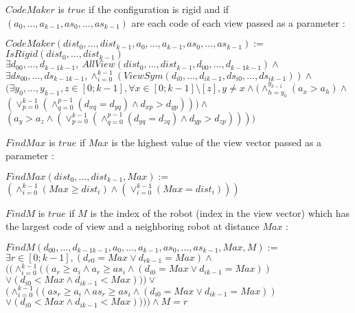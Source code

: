 \documentclass{article}
\begin{document}
$CodeMaker$ is $true$ if the configuration is rigid and if $(a_{0}, ..., a_{k-1}, as_{0}, ..., as_{k-1})$ are each code of each view passed as a parameter :

\begin{center}

$CodeMaker(dist_{0}, ...,dist_{k-1}, a_{0}, ..., a_{k-1}, as_{0}, ..., as_{k-1}):=$\\
$IsRigid(dist_{0}, ...,dist_{k-1})$\\
$\exists d_{00}, ...,d_{k-1k-1},\ AllView(dist_{0}, ...,dist_{k-1}, d_{00}, ...,d_{k-1k-1})\land$\\
$\exists ds_{00}, ...,ds_{k-1k-1}, \land_{i=0}^{k-1} (ViewSym(d_{i0}, ..., d_{ik-1}, ds_{i0}, ..., ds_{ik-1}))\land$\\
$(\exists y_{0}, ..., y_{k-1},z \in [0;k-1], \forall x \in [0;k-1] \setminus [z], y\not=x \land
(\land_{h=y_{0}}^{y_{k-1}}(a_{x} > a_{h}) \land $\\
$(\lor_{p=0}^{k-1}(\land_{q=0}^{p-1}(d_{xq} = d_{yq}) \land d_{xp} > d_{yp} ) ) )\land $\\
$(a_{y} > a_{z} \land (\lor_{p=0}^{k-1}(\land_{q=0}^{p-1}(d_{yq} = d_{zq}) \land d_{yp} > d_{zp} ) ))
)$\\
\end{center}

$FindMax$ is $true$ if $Max$ is the highest value of the view vector passed as a parameter :

\begin{center}

$FindMax(dist_{0}, ...,dist_{k-1}, Max):=$\\
$(\land_{i=0}^{k-1} (Max \geq dist_{i}) \land (\lor_{i=0}^{k-1} (Max = dist_{i})))$
\end{center}

$FindM$ is $true$ if $M$ is the index of the robot (index in the view vector) which has the largest code of view and a neighboring robot at distance $Max$ :

\begin{center}

$FindM(d_{00}, ...,d_{k-1k-1}, a_{0}, ..., a_{k-1}, as_{0}, ..., as_{k-1}, Max, M):=$\\
$\exists r \in [0; k-1], (d_{r0} = Max \lor d_{rk-1} = Max) \land $\\
$((\land_{i=0}^{k-1} ((a_{r} \geq a_i \land a_{r} \geq as_i \land (d_{i0} = Max \lor d_{ik-1} = Max))$\\
$\lor (d_{i0} < Max \land d_{ik-1} < Max))) \lor$\\
$(\land_{i=0}^{k-1} ((as_{r} \geq a_i \land as_{r} \geq as_i \land (d_{i0} = Max \lor d_{ik-1} = Max))$\\
$\lor (d_{i0} < Max \land d_{ik-1} < Max)))) \land M = r $
\end{center}
\end{document}
